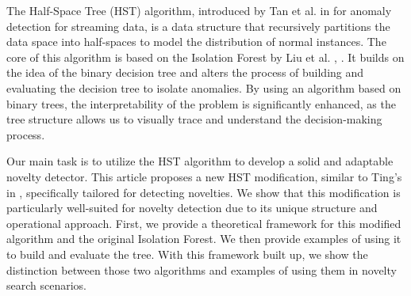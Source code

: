 The Half-Space Tree (HST) algorithm, introduced by Tan et al. in \cite{tan2011fast} for anomaly detection for streaming data, is a data structure that recursively partitions the data space into half-spaces to model the distribution of normal instances.
The core of this algorithm is based on the Isolation Forest by Liu et al. \cite{liu2008isolation}, \cite{liu2012isolation}.
It builds on the idea of the binary decision tree and alters the process of building and evaluating the decision tree to isolate anomalies. By using an algorithm based on binary trees, the interpretability of the problem is significantly enhanced, as the tree structure allows us to visually trace and understand the decision-making process.

Our main task is to utilize the HST algorithm to develop a solid and adaptable novelty detector.
This article proposes a new HST modification, similar to Ting's in \cite{ting2013mass}, specifically tailored for detecting novelties.
We show that this modification is particularly well-suited for novelty detection due to its unique structure and operational approach.
First, we provide a theoretical framework for this modified algorithm and the original Isolation Forest.
We then provide examples of using it to build and evaluate the tree.
With this framework built up, we show the distinction between those two algorithms and examples of using them in novelty search scenarios.


